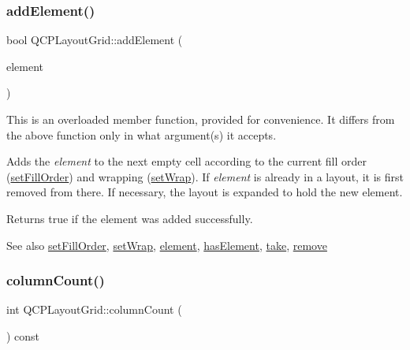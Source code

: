 \subsubsection{\texorpdfstring{add\+Element()}{addElement()}\hspace{0.1cm}{\footnotesize\ttfamily [2/2]}}
{\footnotesize\ttfamily bool Q\+C\+P\+Layout\+Grid\+::add\+Element (\begin{DoxyParamCaption}\item[{\hyperlink{classQCPLayoutElement}{Q\+C\+P\+Layout\+Element} $\ast$}]{element }\end{DoxyParamCaption})}

This is an overloaded member function, provided for convenience. It differs from the above function only in what argument(s) it accepts.

Adds the {\itshape element} to the next empty cell according to the current fill order (\hyperlink{classQCPLayoutGrid_affc2f3cfd22f28698c5b29b960d2a391}{set\+Fill\+Order}) and wrapping (\hyperlink{classQCPLayoutGrid_ab36af18d77e4428386d02970382ee598}{set\+Wrap}). If {\itshape element} is already in a layout, it is first removed from there. If necessary, the layout is expanded to hold the new element.

Returns true if the element was added successfully.

\begin{DoxySeeAlso}{See also}
\hyperlink{classQCPLayoutGrid_affc2f3cfd22f28698c5b29b960d2a391}{set\+Fill\+Order}, \hyperlink{classQCPLayoutGrid_ab36af18d77e4428386d02970382ee598}{set\+Wrap}, \hyperlink{classQCPLayoutGrid_a602b426609b4411cf6a93c3ddf3a381a}{element}, \hyperlink{classQCPLayoutGrid_ab0cf4f7edc9414a3bfaddac0f46dc0a0}{has\+Element}, \hyperlink{classQCPLayoutGrid_aee961c2eb6cf8a85dcbc5a7d7b6c1a00}{take}, \hyperlink{classQCPLayout_a6c58f537d8086f352576ab7c5b15d0bc}{remove} 
\end{DoxySeeAlso}
\mbox{\label{classQCPLayoutGrid_a1a2962cbf45011405b64b913afa8e7a2}} 
\subsubsection{\texorpdfstring{column\+Count()}{columnCount()}}
{\footnotesize\ttfamily int Q\+C\+P\+Layout\+Grid\+::column\+Count (\begin{DoxyParamCaption}{ }\end{DoxyParamCaption}) const\hspace{0.3cm}{\ttfamily [inline]}}

